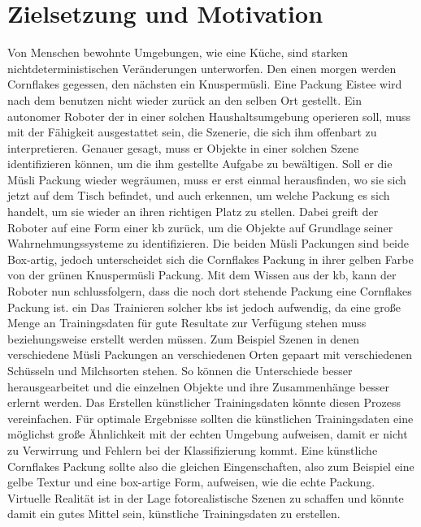 \graphicspath{{./images/}}      
\def\CHAPTERONE{./chapters/Chapter-1} 

\chapter{Zielsetzung und Motivation}
\label{chap:motivation}
%	


Von Menschen bewohnte Umgebungen, wie eine Küche, sind starken nichtdeterministischen Veränderungen unterworfen. Den einen morgen werden Cornflakes gegessen, den nächsten ein Knuspermüsli. Eine Packung Eistee wird nach dem benutzen nicht wieder zurück an den selben Ort gestellt. Ein autonomer Roboter der in einer solchen Haushaltsumgebung operieren soll, muss mit der Fähigkeit ausgestattet sein, die Szenerie, die sich ihm offenbart zu interpretieren. Genauer gesagt, muss er Objekte in einer solchen Szene identifizieren können, um die ihm gestellte Aufgabe zu bewältigen. Soll er die Müsli Packung wieder wegräumen, muss er erst einmal herausfinden, wo sie sich jetzt auf dem Tisch befindet, und auch erkennen, um welche Packung es sich handelt, um sie wieder an ihren richtigen Platz zu stellen.  Dabei greift der Roboter auf eine Form einer \gls{kb} zurück, um die Objekte auf Grundlage seiner Wahrnehmungssysteme zu identifizieren. Die beiden Müsli Packungen sind beide Box-artig, jedoch unterscheidet sich die Cornflakes Packung in ihrer gelben Farbe von der grünen Knuspermüsli Packung. Mit dem Wissen aus der \gls{kb}, kann der Roboter nun schlussfolgern, dass die noch dort stehende Packung eine Cornflakes Packung ist. ein Das Trainieren solcher \glspl{kb} ist jedoch aufwendig, da eine große Menge an Trainingsdaten für gute Resultate zur Verfügung stehen muss beziehungsweise erstellt werden müssen. Zum Beispiel Szenen in denen verschiedene Müsli Packungen an verschiedenen Orten gepaart mit verschiedenen Schüsseln und Milchsorten stehen. So können die Unterschiede besser herausgearbeitet und die einzelnen Objekte und ihre Zusammenhänge besser erlernt werden. Das Erstellen künstlicher Trainingsdaten könnte diesen Prozess vereinfachen. Für optimale Ergebnisse sollten die künstlichen Trainingsdaten eine möglichst große Ähnlichkeit mit der echten Umgebung aufweisen, damit er nicht zu Verwirrung und Fehlern bei der Klassifizierung kommt. Eine künstliche Cornflakes Packung sollte also die gleichen Eingenschaften, also zum Beispiel eine gelbe Textur und eine box-artige Form, aufweisen, wie die echte Packung. Virtuelle Realität ist in der Lage fotorealistische Szenen zu schaffen und könnte damit ein gutes Mittel sein, künstliche Trainingsdaten zu erstellen.  

